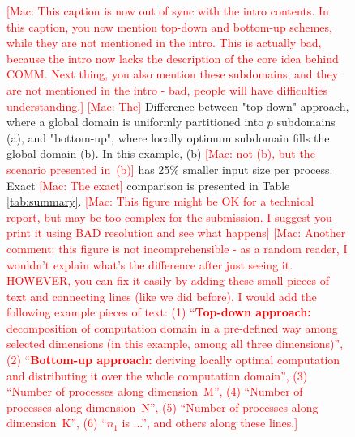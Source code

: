 \documentclass[sigplan,review,anonymous]{acmart}\settopmatter{printfolios=true,printccs=false,printacmref=false}
\newcommand\mac[1]{\textcolor{red}{[Mac: #1]}}
\begin{document}
\begin{figure}[!tbp]
\centering
%
%
\hfill
%
%
\caption{\mac{This caption is now out of sync with the intro contents. In this
caption, you now mention top-down and bottom-up schemes, while they are not
mentioned in the intro. This is actually bad, because the intro now lacks the
description of the core idea behind COMM. Next thing, you also mention these
subdomains, and they are not mentioned in the intro - bad, people will have
difficulties understanding.} \mac{The} Difference between "top-down" approach, 
where a global domain is
uniformly partitioned into $p$ subdomains (a), and "bottom-up", where locally
optimum subdomain fills the global domain (b). In this example, (b) \mac{not 
(b),
but the scenario presented in~(b)} has 25\%
smaller input size per process. Exact \mac{The exact} comparison is presented 
in Table 
\ref{tab:summary}. \mac{This figure might be OK for a technical report,
but may be too complex for the submission. I suggest you print it using
BAD resolution and see what happens}
\mac{Another comment: this figure is not incomprehensible - as a random reader, 
I wouldn't
explain what's the difference after just seeing it. HOWEVER, you can fix it 
easily
by adding these small pieces of text and connecting lines (like we did before).
I would add the following example pieces of text: (1) ``\textbf{Top-down 
approach:} decomposition
of computation domain in a pre-defined way among selected dimensions (in this 
example,
among all three dimensions)'', (2) ``\textbf{Bottom-up approach:} deriving 
locally optimal
computation and distributing it over the whole computation domain'', (3) 
``Number of processes
along dimension~M'', (4) ``Number of processes along dimension~N'', (5) 
``Number of processes
along dimension~K'', (6) ``$n_1$ is ...'', and others along these lines.}
}
%
\label{fig:topdown-vs-bottomup}
\end{figure}
\end{document}
